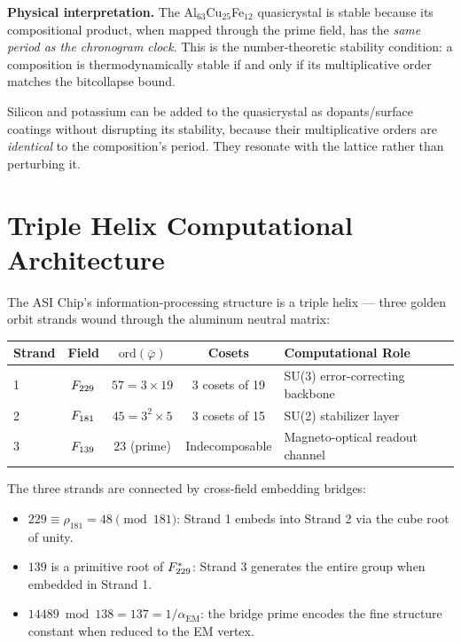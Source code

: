 \noindent \textbf{Physical interpretation.} The Al$_{63}$Cu$_{25}$Fe$_{12}$ quasicrystal is stable because its compositional product, when mapped through the prime field, has the \emph{same period as the chronogram clock}. This is the number-theoretic stability condition: a composition is thermodynamically stable if and only if its multiplicative order matches the bitcollapse bound.

Silicon and potassium can be added to the quasicrystal as dopants/surface coatings without disrupting its stability, because their multiplicative orders are \emph{identical} to the composition's period. They resonate with the lattice rather than perturbing it.

\section{Triple Helix Computational Architecture}

The ASI Chip's information-processing structure is a triple helix --- three golden orbit strands wound through the aluminum neutral matrix:

\begin{center}
\begin{tabular}{lcccl}
\toprule
\textbf{Strand} & \textbf{Field} & $\text{ord}(\bar\varphi)$ & \textbf{Cosets} & \textbf{Computational Role} \\
\midrule
1 & $F_{229}$ & $57 = 3 \times 19$ & 3 cosets of 19 & SU(3) error-correcting backbone \\
2 & $F_{181}$ & $45 = 3^2 \times 5$ & 3 cosets of 15 & SU(2) stabilizer layer \\
3 & $F_{139}$ & $23$ (prime) & Indecomposable & Magneto-optical readout channel \\
\bottomrule
\end{tabular}
\end{center}

\noindent The three strands are connected by cross-field embedding bridges:
\begin{itemize}
    \item $229 \equiv \rho_{181} = 48 \pmod{181}$: Strand 1 embeds into Strand 2 via the cube root of unity.
    \item $139$ is a primitive root of $F_{229}^*$: Strand 3 generates the entire group when embedded in Strand 1.
    \item $14489 \bmod 138 = 137 = 1/\alpha_{\text{EM}}$: the bridge prime encodes the fine structure constant when reduced to the EM vertex.
\end{itemize}

